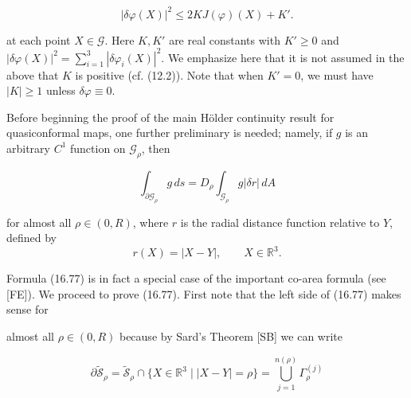 \begin{equation}
|\delta\varphi(X)|^2 \leq 2KJ(\varphi)(X) + K'.
\tag{16.76}
\end{equation}

at each point $X \in \mathcal G$. Here $K, K'$ are real constants with $K' \geq 0$ and $|\delta\varphi(X)|^2 = \sum_{i=1}^3 |\delta\varphi_i(X)|^2$. We emphasize here that it is not assumed in the above that $K$ is positive (cf. (12.2)). Note that when $K' = 0$, we must have $|K| \geq 1$ unless $\delta\varphi \equiv 0$.

Before beginning the proof of the main Hölder continuity result for quasiconformal maps, one further preliminary is needed; namely, if $g$ is an arbitrary $C^1$ function on $\mathcal G_\rho$, then

\begin{equation}
\int_{\partial \mathcal G_\rho} g\, ds = D_\rho \int_{\mathcal G_\rho} g|\delta r|\, dA
\tag{16.77}
\end{equation}

for almost all $\rho \in (0,R)$, where $r$ is the radial distance function relative to $Y$, defined by
\[
r(X) = |X - Y|, \qquad X \in \mathbb R^3.
\]

Formula (16.77) is in fact a special case of the important co-area formula (see [FE]). We proceed to prove (16.77). First note that the left side of (16.77) makes sense for


\pagestyle{empty}


almost all $\rho \in (0, R)$ because by Sard's Theorem [SB] we can write

\begin{equation}\tag{16.78}
\partial \widetilde{\mathscr{S}}_{\rho}
= \widetilde{\mathscr{S}}_{\rho} \cap \{X \in \mathbb{R}^{3}\mid |X-Y|=\rho\}
= \bigcup_{j=1}^{n(\rho)} \Gamma_{\rho}^{(j)}
\end{equation}


